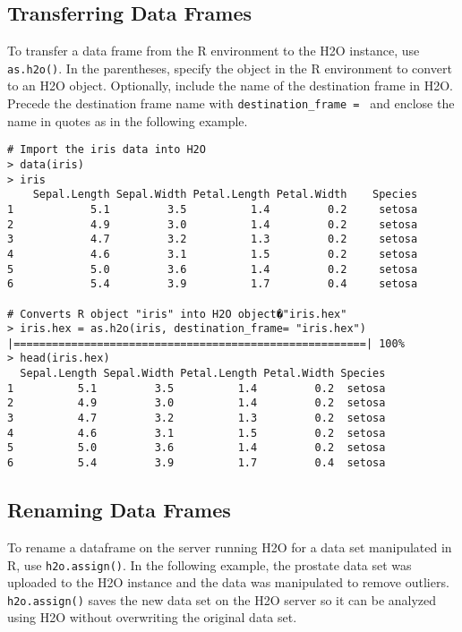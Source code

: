{\subsection{Transferring Data Frames}
To transfer a data frame from the R environment to the H2O instance, use  {\texttt{as.h2o()}}. In the parentheses, specify the object in the R environment to convert to an H2O object. Optionally, include the name of the destination frame in H2O. Precede the destination frame name with {\texttt{destination\_frame = }} and enclose the name in quotes as in the following example.

\small
\begin{lstlisting}[style=R]
# Import the iris data into H2O
> data(iris)
> iris
    Sepal.Length Sepal.Width Petal.Length Petal.Width    Species
1            5.1         3.5          1.4         0.2     setosa
2            4.9         3.0          1.4         0.2     setosa
3            4.7         3.2          1.3         0.2     setosa
4            4.6         3.1          1.5         0.2     setosa
5            5.0         3.6          1.4         0.2     setosa
6            5.4         3.9          1.7         0.4     setosa

# Converts R object "iris" into H2O object�"iris.hex"
> iris.hex = as.h2o(iris, destination_frame= "iris.hex")
|=======================================================| 100%
> head(iris.hex)
  Sepal.Length Sepal.Width Petal.Length Petal.Width Species
1          5.1         3.5          1.4         0.2  setosa
2          4.9         3.0          1.4         0.2  setosa
3          4.7         3.2          1.3         0.2  setosa
4          4.6         3.1          1.5         0.2  setosa
5          5.0         3.6          1.4         0.2  setosa
6          5.4         3.9          1.7         0.4  setosa
\end{lstlisting}
\normalsize

\subsection{Renaming Data Frames}

To rename a dataframe on the server running H2O for a data set manipulated in R, use {\texttt{h2o.assign()}}. In the following example, the prostate data set was uploaded to the H2O instance and the data was manipulated to remove outliers. {\texttt{h2o.assign()}} saves the new data set on the H2O server so it can be analyzed using H2O without overwriting the original data set.  

}
